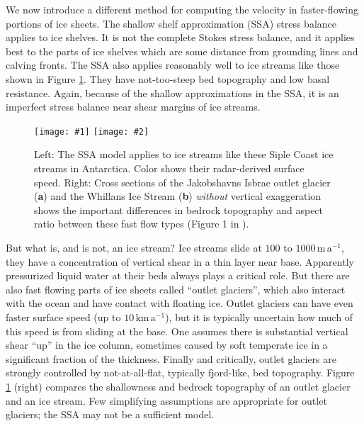 \documentclass[titlepage,letterpaper,final,12pt]{scrartcl}
\newcommand{\twofigsizes}[5]{
\begin{figure}[ht]
\centering
\texttt{[image: \#1]} \quad
\texttt{[image: \#2]}
\caption{#3}
\label{fig:#1}
\end{figure}}
\begin{document}
We now introduce a different method for computing the velocity in faster-flowing portions of ice sheets.  The shallow shelf approximation (SSA) stress balance applies to ice shelves.  It is not the complete Stokes stress balance, and it applies best to the parts of ice shelves which are some distance from grounding lines and calving fronts.  The SSA also applies reasonably well to ice streams like those shown in Figure \ref{fig:siple}.  They have not-too-steep bed topography and low basal resistance.  Again, because of the shallow approximations in the SSA, it is an imperfect stress balance near shear margins of ice streams.

\twofigsizes{siple}{streamisbrae}{Left:  The SSA model applies to ice streams like these Siple Coast ice streams in Antarctica.  Color shows their radar-derived surface speed.  Right: Cross sections of the Jakobshavns Isbrae outlet glacier (\textbf{a}) and the Whillans Ice Stream (\textbf{b}) \emph{without} vertical exaggeration shows the important differences in bedrock topography and aspect ratio between these fast flow types (Figure 1 in \cite{TrufferEchelmeyer}).}{2.8in}{2.9in}

But what is, and is not, an ice stream?  Ice streams slide at $100$ to $1000 \,\text{m}\,\text{a}^{-1}$, they have a concentration of vertical shear in a thin layer near base.  Apparently pressurized liquid water at their beds always plays a critical role.  But there are also fast flowing parts of ice sheets called ``outlet glaciers'', which also interact with the ocean and have contact with floating ice.  Outlet glaciers can have even faster surface speed (up to $10 \,\text{km}\,\text{a}^{-1}$), but it is typically uncertain how much of this speed is from sliding at the base.  One assumes there is substantial vertical shear ``up'' in the ice column, sometimes caused by soft temperate ice in a significant fraction of the thickness.  Finally and critically, outlet glaciers are strongly controlled by not-at-all-flat, typically fjord-like, bed topography.  Figure \ref{fig:siple} (right) compares the shallowness and bedrock topography of an outlet glacier and an ice stream.  Few simplifying assumptions are appropriate for outlet glaciers; the SSA may not be a sufficient model.
\end{document}
